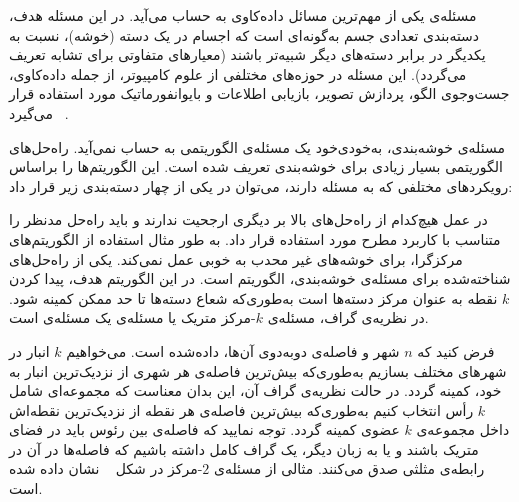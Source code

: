 


مسئله‌ی  یکی از مهم‌ترین مسائل داده‌کاوی به حساب می‌آید.
در این مسئله هدف، دسته‌بندی تعدادی جسم به‌گونه‌ای است که اجسام در یک دسته (خوشه)، نسبت به یکدیگر در برابر دسته‌های دیگر شبیه‌تر باشند (معیارهای متفاوتی برای تشابه تعریف می‌گردد).
این مسئله در حوزه‌های مختلفی از علوم کامپیوتر، از جمله داده‌کاوی، جست‌وجوی الگو، پردازش تصویر، بازیابی اطلاعات و بایوانفورماتیک مورد استفاده قرار می‌گیرد ~.

مسئله‌ی خوشه‌بندی، به‌خودی‌خود یک مسئله‌ی الگوریتمی به حساب نمی‌آید.
راه‌حل‌های الگوریتمی بسیار زیادی برای خوشه‌بندی تعریف شده است.
این الگوریتم‌ها را براساس رویکرد‌های مختلفی که به مسئله دارند، می‌توان در یکی از چهار دسته‌بندی زیر قرار داد:


در عمل هیچ‌کدام از راه‌حل‌های بالا بر دیگری ارجحیت ندارند و باید راه‌حل مدنظر را متناسب با کاربرد مطرح مورد استفاده قرار داد.
به طور مثال استفاده از الگوریتم‌های مرکزگرا، برای خوشه‌های غیر محدب به خوبی عمل نمی‌کند.
یکی از راه‌حل‌های شناخته‌شده برای مسئله‌ی خوشه‌بندی، الگوریتم  است.
در این الگوریتم هدف، پیدا کردن $k$ نقطه به عنوان مرکز دسته‌ها است به‌طوری‌که شعاع دسته‌ها تا حد ممکن کمینه شود.
در نظریه‌ی گراف، مسئله‌ی $k$-مرکز متریک یا مسئله‌ی  یک مسئله‌ی  است.

فرض کنید که $n$ شهر و فاصله‌ی دوبه‌دوی آن‌ها، داده‌شده است.
می‌خواهیم $k$ انبار در شهرهای مختلف بسازیم به‌طوری‌که بیش‌ترین فاصله‌ی هر شهری از نزدیک‌ترین انبار به خود، کمینه گردد.
در حالت نظریه‌ی گراف آن، این بدان معناست که مجموعه‌ای شامل $k$ رأس انتخاب کنیم به‌طوری‌که بیش‌ترین فاصله‌ی هر نقطه از نزدیک‌ترین نقطه‌اش داخل مجموعه‌ی $k$ عضوی کمینه گردد.
توجه نمایید که فاصله‌ی بین رئوس باید در فضای متریک باشند و یا به زبان دیگر، یک گراف کامل داشته باشیم که فاصله‌ها در آن در رابطه‌ی مثلثی صدق می‌کنند.
مثالی از مسئله‌ی $2$-مرکز در شکل ~ نشان داده شده است.

